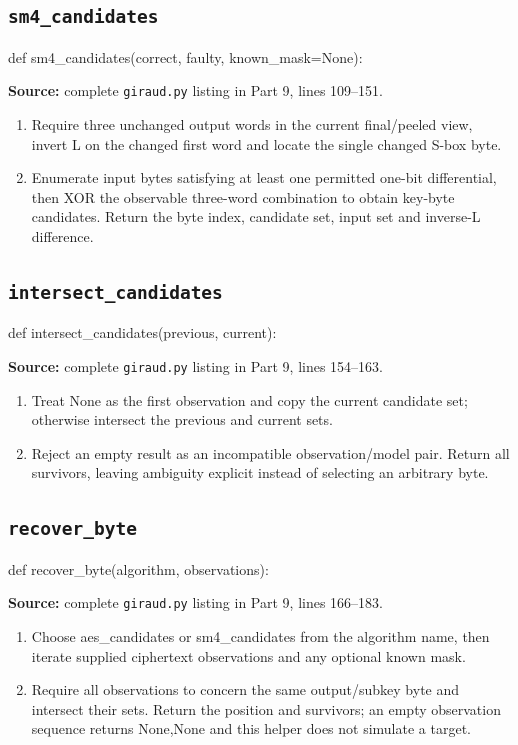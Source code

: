 \subsection{\texttt{sm4\_\allowbreak{}candidates}}
\begin{lightcode}
def sm4_candidates(correct, faulty, known_mask=None):
\end{lightcode}
\noindent\textbf{Source:} complete \texttt{giraud.py} listing in Part 9, lines 109--151.
\begin{enumerate}
\item Require three unchanged output words in the current final/peeled view, invert L on the changed first word and locate the single changed S-box byte.
\item Enumerate input bytes satisfying at least one permitted one-bit differential, then XOR the observable three-word combination to obtain key-byte candidates. Return the byte index, candidate set, input set and inverse-L difference.
\end{enumerate}
\subsection{\texttt{intersect\_\allowbreak{}candidates}}
\begin{lightcode}
def intersect_candidates(previous, current):
\end{lightcode}
\noindent\textbf{Source:} complete \texttt{giraud.py} listing in Part 9, lines 154--163.
\begin{enumerate}
\item Treat None as the first observation and copy the current candidate set; otherwise intersect the previous and current sets.
\item Reject an empty result as an incompatible observation/model pair. Return all survivors, leaving ambiguity explicit instead of selecting an arbitrary byte.
\end{enumerate}
\subsection{\texttt{recover\_\allowbreak{}byte}}
\begin{lightcode}
def recover_byte(algorithm, observations):
\end{lightcode}
\noindent\textbf{Source:} complete \texttt{giraud.py} listing in Part 9, lines 166--183.
\begin{enumerate}
\item Choose aes\_candidates or sm4\_candidates from the algorithm name, then iterate supplied ciphertext observations and any optional known mask.
\item Require all observations to concern the same output/subkey byte and intersect their sets. Return the position and survivors; an empty observation sequence returns None,None and this helper does not simulate a target.
\end{enumerate}
